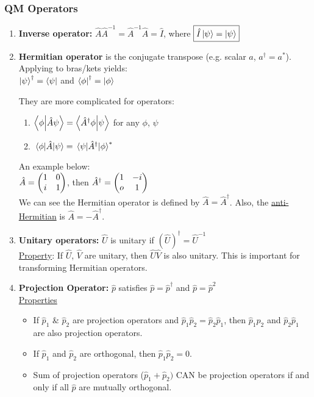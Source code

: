 \documentclass[]{article}
\begin{document}
\subsubsection{QM Operators}
\begin{enumerate}
    \item \textbf{Inverse operator:} $\hat{A}\hat{A}^{-1} = \hat{A}^{-1}\hat{A} = \hat{I}$, where $\boxed{\hat{I}\ket{\psi} = \ket{\psi}}$
    \item \textbf{Hermitian operator} is the conjugate transpose (e.g. scalar $a$, $a^{\dagger} = a^*$). Applying to bras/kets yields:\\
    $\ket{\psi}^{\dagger} = \bra{\psi}$ and $\bra{\phi}^{\dagger} = \ket{\phi}$
    
    They are more complicated for operators:
    \begin{enumerate}
        \item $\braket{\phi}{\hat{A}\psi} = \braket{\hat{A}^{\dagger}\phi}{\psi}$ for any $\phi$, $\psi$
        \item $\mel{\phi}{\hat{A}}{\psi} = \mel{\psi}{\hat{A}^{\dagger}}{\phi}^*$
    \end{enumerate}
    An example below:\\
    $\hat{A} = \mqty(1 & 0 \\ i & 1)$, then $\hat{A}^{\dagger} = \mqty(1 & -i \\ o & 1)$\\
    We can see the Hermitian operator is defined by 
    $\boxed{\hat{A} = \hat{A}^{\dagger}}$. Also, the \underline{anti-Hermitian} is $\boxed{\hat{A} = -\hat{A}^{\dagger}}$.
    \item \textbf{Unitary operators:} $\hat{U}$ is unitary if $(\hat{U})^{\dagger} = \hat{U}^{-1}$\\
    \underline{Property}: If $\hat{U}$, $\hat{V}$ are unitary, then $\hat{U}\hat{V}$ is also unitary. This is important for transforming Hermitian operators.
    \item \textbf{Projection Operator:} $\hat{p}$ satisfies $\hat{p} = \hat{p}^{\dagger}$ and $\hat{p} = \hat{p}^2$\\
    \underline{Properties}
    \begin{itemize}
        \item If $\hat{p}_1$ \& $\hat{p}_2$ are projection operators and $\hat{p}_1\hat{p}_2 = \hat{p}_2\hat{p}_1$, then $\hat{p}_1\hat{p}_2$ and $\hat{p}_2\hat{p}_1$ are also projection operators.
        \item If $\hat{p}_1$ and $\hat{p}_2$ are orthogonal, then $\hat{p}_1\hat{p}_2 = 0$.
        \item Sum of projection operators ($\hat{p}_1 + \hat{p}_2)$ CAN be projection operators if and only if all $\hat{p}$ are mutually orthogonal.
    \end{itemize}
\end{enumerate}
\end{document}
